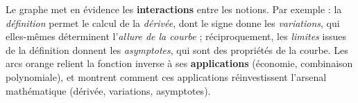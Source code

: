 \documentclass[10pt,a4paper]{article}
\begin{document}
\begin{center}
	\end{center}
	
	\vspace{0.4cm}
	\begin{acomprendre}[title={\ding{110}~\textbf{\`A COMPRENDRE}~\textbullet~Lecture du graphe}]
		Le graphe met en \'evidence les \textbf{interactions} entre les notions. Par exemple : la \emph{d\'efinition} permet le calcul de la \emph{d\'eriv\'ee}, dont le signe donne les \emph{variations}, qui elles-m\^emes d\'eterminent l'\emph{allure de la courbe} ; r\'eciproquement, les \emph{limites} issues de la d\'efinition donnent les \emph{asymptotes}, qui sont des propri\'et\'es de la courbe. Les arcs \textcolor{orange!80!black}{orange} relient la fonction inverse \`a ses \textbf{applications} (\'economie, combinaison polynomiale), et montrent comment ces applications r\'einvestissent l'arsenal math\'ematique (d\'eriv\'ee, variations, asymptotes).
	\end{acomprendre}
	
\end{document}
